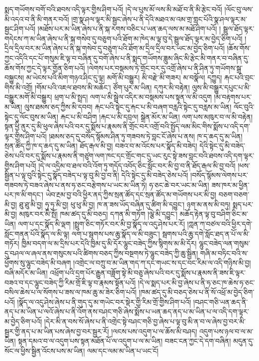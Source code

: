 སྨད་གཡོགས་བགོ་བའི་ཐབས་འདི་ལྟར་གྱིས་ཤིག་པའོ། །དེ་ལ་པུས་མོ་ལས་མི་མཐོ་བ་ནི་མི་རྩེང་བའོ། །ལོང་བུ་ལས་མི་འདའ་བ་ནི་མི་གནར་བའོ། །གྲ་སྣ་ཤལ་ལྟར་མི་སྦྱང་ཞེས་པ་ནི་དེའི་མཐའ་མ་འམ་གྲ་གླང་པོའི་སྣ་ཤལ་ལྟར་མ་སྦྱང་ཤིག་པའོ། །མཐོས་པར་མ་ཡིན་ཞེས་པ་ནི་སྐ་རགས་བཅིང་པ་ཡན་ཆད་ལས་མ་མཐོ་ཤིག་པའོ། །
སྦྲུལ་ཐོད་ལྟར་གདེངས་ཀ་མ་ཡིན་ཞེས་པ་ནི་སྐ་གསེབ་དུ་བཅུག་པའི་ཐོག་མ་ཁེད་མ་ལྟ་བུ་དེ་སྦྲུལ་ཐོད་ལྟར་མ་བྱེད་ཅིག་པའོ། །དྲིལ་དྲིལ་བར་མ་ཡིན་ཞེས་པ་ནི་སྐ་གསེབ་དུ་བཅུག་པའི་ཐོག་མ་དྲིལ་དྲིལ་བར་ཡང་མ་བྱེད་ཅིག་པའོ། །ཆོས་གོས་ཀྱང་འདིའི་དང་པོ་གསུམ་ཇི་ལྟ་བ་བཞིན་དུ་བགོ་ཞེས་པ་ནི་སྨད་གཡོགས་ཟླུམ་ཞིང་མི་རྩེང་མི་གནར་བ་བཞིན་དུ་ཆོས་གོས་ཀྱང་དེ་ལྟར་གྱོན་ཅིག་པའོ། །ལེགས་པར་བསྡམས་ཏེ་གྲོང་བར་དུ་འགྲོ་ཞེས་པ་ནི་ཤིན་ཏུ་གཡོགས་སྒྲ་བསྐྱུངས། མ་ཡེངས་པའི་མིག་གཉའ་ཤིང་དུ་ལྟ། མགོ་མི་བསྒྱུར། མི་བརྫེ་མི་གཟར། མ་བསྣོལ། དཀྱུད། རྐང་པའི་བྲང་གིས་མི་འགྲོ། །གོམ་པའི་འཇལ་ཐབས་མི་མཆོང་། ཙོག་པུར་མ་ཡིན། དཀུར་མི་བརྟེན། ལུས་མི་བསྒྱུར་དཔུང་པ་མི་བསྒྱུར་མགོ་མི་བསྒྱུར། ཕྲག་པ་མི་སྤྲད། ལག་པ་མི་སྦྲེལ་འདིར་མ་བསྡམས་པས་སྟན་ལ་མི་འདུག །མ་བརྟགས་པར་མ་ཡིན། ལུས་ཐམས་ཅད་ཀྱིས་མི་དབབ། རྐང་པའི་སྟེང་དུ་རྐང་པ་མི་བཞག་བརླའི་སྟེང་དུ་བརླས་མ་ཡིན། ལོང་བུའི་སྟེང་དུ་ལོང་བུས་མ་ཡིན། རྐང་པ་མི་བཤིག །རྐང་པ་མི་དབྲལ། སྒྲེན་མོར་མ་ཡིན། ལག་པས་མཁུར་བ་ལ་མི་བརྟེན། སྟན་ཕྱི་ནུར་དུ་མི་ཕུལ་ཞེས་པའི་བར་དུ་སྨོས་པ་རྣམས་ནི་གྲོང་བར་འགྲོ་བའི་སྤྱོད་ལམ་མིང་གིས་སྨོས་པ་འདི་དག་ལྟར་གྱིས་ཤིག་པའོ། །ཐམས་ཅད་དུ་བསོད་སྙོམས་ཤིན་ཏུ་གཟབས་ཏེ་བླང་ངོ་ཞེས་པ་ནས། ཁ་ད་ཆད་དུ་མ་ཡིན། སྲན་ཚོད་ཀྱི་ཁ་ད་ཆད་དུ་མ་ཡིན། ཐོད་རྒལ་མི་བྱ། བཟའ་བ་མ་འོངས་པར་སྣོད་མི་བཟེད། དེའི་སྟེང་དུ་མི་བཟེད་ཅེས་པའི་བར་དུ་སྨོས་པ་རྣམས་ནི་གཙུག་ལག་ཁང་དང་གྲོང་གང་དུ་ཡང་རུང་སྟེ་ཟས་བླང་བའི་ཐབས་འདི་དག་ལྟར་གྱིས་ཤིག་པའོ། །དེ་ལ་འདྲིམ་བ་ཐལ་བའི་འོག་ཏུ་གདོད་འབོད་ཅིང་སློང་བར་མི་བྱ་བ་ནི་ཐོད་རྒལ་མི་བྱ་བའོ། །ཕས་སྦྱིན་པ་ལྟ་བུའི་སྟེང་དུ་སྣོད་བཟེད་པ་ལྟ་བུ་མི་བྱ་བ་ནི། དེའི་སྟེང་དུ་མི་བཟེད་ཅེས་པའོ། །བསོད་སྙོམས་ལེགས་པར་གཟབས་ཏེ་བཟའ་ཞེས་པ་ནས་ཧ་ཅང་བརྩེགས་པ་ཡང་མ་ཡིན་ཏེ། ཧ་ཅང་ཆེ་བར་ཡང་མ་ཡིན། ཟས་ཁར་མ་ཕྱིན་པར་ཁ་མི་གདང་། ཡེབ་རྔམ་བྱ་བའི་ཕྱིར་ནད་ཀྱིས་སྲན་ཚོད་དང་སྲན་ཚོད་མ་གཡོགས་པར་མི་བྱ། བཅག་བཅག་མི་བྱ། ཐུ་ཐུ་མི་བྱ། ཧུ་ཧུ་མི་བྱ། ཕུ་ཕུ་མི་བྱ། ཁ་ན་ཟས་ཡོད་བཞིན་དུ་ཚིག་མི་དབྱུང་། ཉག་མ་ནས་མི་བཏུ། སྨད་པར་མི་བྱ། མཁུར་བར་མི་སྤོ། ཁམ་ཚད་དུ་མི་བཅད། དཀན་མི་གཏོག །ལྕེ་མི་དབྱུང་། མཆོད་རྟེན་ལྟ་བུ་བཤིག་ཅིང་མ་ཡིན། ལག་པ་དང་སྣོད་མི་ལྡག །སྤྲུག་ཅིང་གཏོར་བར་མི་བྱ་སྣོད་ལ་འདུ་ཤེས་པར་རོ། །ཀླན་ཀ་བཙལ་བའི་ཕྱིར་དགེ་སློང་གནན་པོའི་སྣོད་ལ་མི་ལྟ། ལག་པ་སྦགས་པས་ཆུ་སྣོད་ལ་མི་བཟུང་། སྦགས་པའི་ཆུ་དགེ་སློང་ཐད་ན་པོ་ལ་མི་གཏོར། ཁྱིམ་བདག་ལ་མ་དྲིས་པར་དེའི་ཁྱིམ་དུ་མི་དོར་ལྷུང་བཟེད་ཀྱིས་སྙིགས་མ་མི་དོར། ལྷུང་བཟེད་ལན་གསུམ་དུ་བཤལ་ལ་ཞལ་ནས་གསུངས་པའི་ཚིགས་བཅད་ཀྱིས་བསྔགས་ཏེ་ལྷུང་བཟེད་ཀྱི་ཆུ་སྦྱིན། གཞི་མ་བཏིང་བའི་ས་ཕྱོགས་སུ་ལྷུང་བཟེད་མི་བཞག །འགྲེང་ལ་བཀྲུ་བ་མ་ཡིན་གད་ཀ་དང་གཡང་ས་དང་བང་རིམ་ལ་འདི་གཉིས་མི་བྱ། བཞི་མདོར་མ་ཡིན། འཕྲོག་པའི་དྲག་པོར་རྒྱུན་བཟློག་སྟེ་མི་བཅུ་ཞེས་པའི་བར་དུ་སྨོས་པ་རྣམས་ནི་ཟས་ཇི་ལྟར་བཟའ་བ་དང་ལྷུང་བཟེད་ཀྱི་རིམ་གྲོ་ཇི་ལྟ་བ་རྣམས་སྟོན་པའོ། །དེ་ལ་སྨད་པར་མི་བྱ་ཞེས་པ་ནི་ཧ་ཅང་ཁ་ཆེས་ཧ་ཅང་བསིལ་ཆེས་པ་ལ་སོགས་པ་ཟས་ལ་ཁམ་ཆུ་མ་ཟེར་ཅིག་པའོ། །ཁམ་ཚད་དུ་མི་བཅད་ཅེས་པ་ནི་སོ་འཕྲོ་མ་བྱེད་ཅིག་པའོ། །སྣོད་ལ་འདུ་ཤེས་ཞེས་པ་ནི་གུད་དུ་མ་གཡེང་བར་སྡེར་གྱི་རིམ་གྲོ་གྱིས་ཤིག་པའོ། །བཤང་གཅི་ཡན་ཆད་ནི་ནད་པ་མ་ཡིན་པ་ལའོ་ཞེས་པ་ནི་འོག་ནས་བཤང་གཅི་ཞེས་སྨོས་པ་ཡན་ཆད་ནད་པ་མ་ཡིན་པ་ལ་འདི་དག་ལྟར་མ་བྱེད་ཅིག་པའོ། །དེར་མི་ན་བས་སོ་ཞེས་པ་ནི་འགྲེང་སྟེ་བཤང་གཅི་བྱ་ཞེས་པ་ལྟ་བུ་མི་ན་བ་ལ་ཞེས་བྱ་བར་མི་སྦྱར་གྱི་ནད་པ་མ་ཡིན་པས་ཞེས་བྱ་བར་སྦྱར་རོ། །ལངས་པས་འདུག་པ་ལ་ཆོས་མི་བཤད། འདུག་པས་ཉལ་བ་ལ་མ་ཡིན། སྟན་དམའ་བ་ལ་འདུག་པས་སྟན་མཐོན་པོ་ལ་འདུག་པ་ལ་མ་ཡིན། བཟང་ངན་ཀྱང་དེ་དག་བཞིན། མདུན་དུ་སོང་ལ་ཕྱིས་སྦྱིན་འོངས་པས་མ་ཡིན། ལམ་དང་ལམ་མ་ཡིན་པ་ཡང་ངོ། 